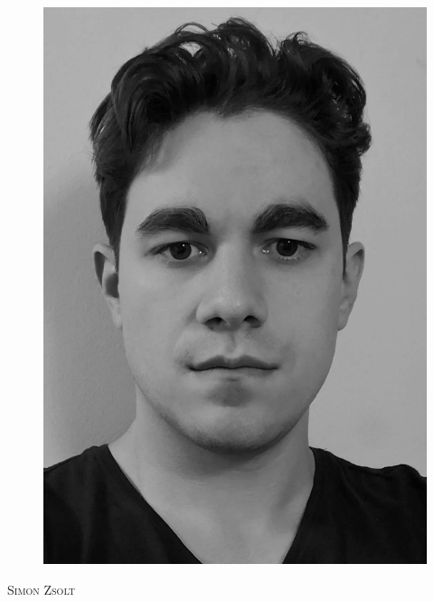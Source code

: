 

\setlength{\parindent}{0em}

\def \leftHeader{CV}
\def \rightHeader{Simon Zsolt}
\def \position{}

\setmainfont[Mapping=tex-text,Numbers=OldStyle,Ligatures=TeX]{Linux Biolinum O}



\begin{figure}
  \flushright
  \includegraphics[scale=0.4]{portrait_mono} 
\end{figure}

\begin{Large}
  \textsc{Simon Zsolt}
  \vspace{1em}
\end{Large}

\large

